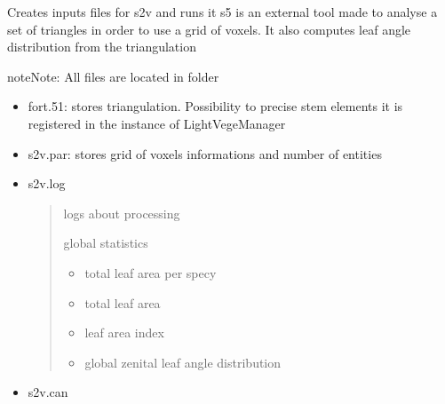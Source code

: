 \documentclass[letterpaper,10pt,english]{sphinxmanual}
\begin{document}
\begin{fulllineitems}
\begin{fulllineitems}
\label{\detokenize{reference:LVM.LightVegeManager.s2v}}
\pysigstartsignatures
{}
\pysigstopsignatures
\sphinxAtStartPar
Creates inputs files for s2v and runs it
s5 is an external tool made to analyse a set of triangles in order to use a grid of voxels.
It also computes leaf angle distribution from the triangulation

\begin{sphinxadmonition}{note}{Note:}
\sphinxAtStartPar
All files are located in  folder
\end{sphinxadmonition}

\sphinxAtStartPar
{}
\begin{itemize}
\item {} 
\sphinxAtStartPar
fort.51: stores triangulation. Possibility to precise stem elements it is registered in the instance of LightVegeManager

\item {} 
\sphinxAtStartPar
s2v.par: stores grid of voxels informations and number of entities

\end{itemize}

\sphinxAtStartPar
{}
\begin{itemize}
\item {} 
\sphinxAtStartPar
s2v.log
\begin{quote}

\sphinxAtStartPar
logs about processing

\sphinxAtStartPar
global statistics
\begin{itemize}
\item {} 
\sphinxAtStartPar
total leaf area per specy

\item {} 
\sphinxAtStartPar
total leaf area

\item {} 
\sphinxAtStartPar
leaf area index

\item {} 
\sphinxAtStartPar
global zenital leaf angle distribution

\end{itemize}
\end{quote}

\item {} 
\sphinxAtStartPar
s2v.can
\begin{quote}


\end{quote}
\end{itemize}
\end{fulllineitems}
\end{fulllineitems}
\end{document}
